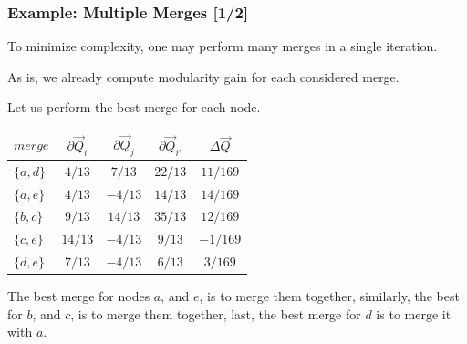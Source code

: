 \documentclass{beamer}
\begin{document}
\begin{frame}

    \frametitle{Example: Multiple Merges [1/2]}

    To minimize complexity, one may perform many merges in a single iteration.\pause

    \vspace{2.5mm}
    As is, we already compute modularity gain for each considered merge.\pause

    \vspace{2.5mm}
    Let us perform the best merge for each node.\pause

    \vspace{2.5mm}
    \begin{center}
        \begin{tabular}{l | c c c c}
            $ merge    $ & $ \partial \vec{Q}_{i} $ & $ \partial \vec{Q}_{j} $ & $ \partial \vec{Q}_{i'} $ & $ \Delta \vec{Q} $ \\
            \hline
            \rowcolor{ummaize}
            $ \{a, d\} $ & $ 4/13  $ & $  7/13  $ & $ 22/13 $ & $ 11/169 $ \\
            \rowcolor{ummaize}
            $ \{a, e\} $ & $ 4/13  $ & $ -4/13  $ & $ 14/13 $ & $ 14/169 $ \\
            \rowcolor{ummaize}
            $ \{b, c\} $ & $  9/13 $ & $  14/13 $ & $ 35/13 $ & $ 12/169 $ \\
            $ \{c, e\} $ & $ 14/13 $ & $ -4/13  $ & $  9/13 $ & $ -1/169 $ \\
            $ \{d, e\} $ & $  7/13 $ & $ -4/13  $ & $  6/13 $ & $  3/169 $ \\
        \end{tabular}
    \end{center}\pause

    \vspace{2.5mm}
    The best merge for nodes $ a $, and $ e $, is to merge them together, similarly, the best for $ b $, and $ c $, is to merge them together, last, the best merge for $ d $ is to merge it with $ a $.

\end{frame}
\end{document}
